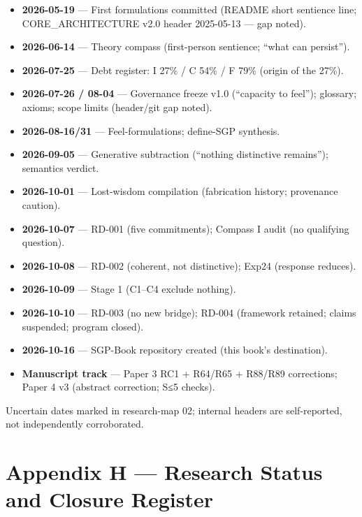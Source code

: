 \documentclass[
  11pt,
]{book}
\providecommand{\tightlist}{%
  \setlength{\itemsep}{0pt}\setlength{\parskip}{0pt}}
\begin{document}
\begin{itemize}
\tightlist
\item
  \textbf{2026-05-19} --- First formulations committed (README short
  sentience line; CORE\_ARCHITECTURE v2.0 header 2025-05-13 --- gap
  noted).
\item
  \textbf{2026-06-14} --- Theory compass (first-person sentience; ``what
  can persist'').
\item
  \textbf{2026-07-25} --- Debt register: I 27\% / C 54\% / F 79\%
  (origin of the 27\%).
\item
  \textbf{2026-07-26 / 08-04} --- Governance freeze v1.0 (``capacity to
  feel''); glossary; axioms; scope limits (header/git gap noted).
\item
  \textbf{2026-08-16/31} --- Feel-formulations; define-SGP synthesis.
\item
  \textbf{2026-09-05} --- Generative subtraction (``nothing distinctive
  remains''); semantics verdict.
\item
  \textbf{2026-10-01} --- Lost-wisdom compilation (fabrication history;
  provenance caution).
\item
  \textbf{2026-10-07} --- RD-001 (five commitments); Compass I audit (no
  qualifying question).
\item
  \textbf{2026-10-08} --- RD-002 (coherent, not distinctive); Exp24
  (response reduces).
\item
  \textbf{2026-10-09} --- Stage 1 (C1--C4 exclude nothing).
\item
  \textbf{2026-10-10} --- RD-003 (no new bridge); RD-004 (framework
  retained; claims suspended; program closed).
\item
  \textbf{2026-10-16} --- SGP-Book repository created (this book's
  destination).
\item
  \textbf{Manuscript track} --- Paper 3 RC1 + R64/R65 + R88/R89
  corrections; Paper 4 v3 (abstract correction; \textbar S\textbar≤5
  checks).
\end{itemize}

Uncertain dates marked in research-map 02; internal headers are
self-reported, not independently corroborated.

\newpage

\chapter{Appendix H --- Research Status and Closure
Register}\label{appendix-h-research-status-and-closure-register}
\end{document}

